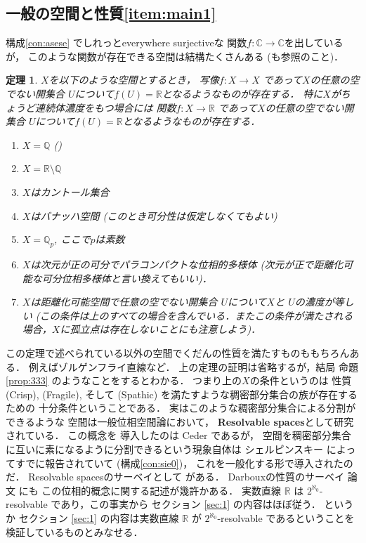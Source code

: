 \documentclass[leqno, a4paper, 12pt]{jsarticle}
\newtheorem{thm}{定理}
\theoremstyle{definition}
\newcommand{\qq}{\mathbb{Q}}
\newcommand{\rr}{\mathbb{R}}
\newcommand{\cc}{\mathbb{C}}
\newcommand{\myco}{2^{\aleph_{0}}}
\newcommand{\mysei}{\textup{(Crisp)}}
\newcommand{\mysq}{\textup{(Fragile)}}
\newcommand{\mysw}{\textup{(Spathic)}}
\begin{document}
\subsection{一般の空間と性質\ref{item:main1}}


構成\ref{con:asese}
でしれっとeverywhere surjectiveな
関数$f\colon\cc\to\cc$を出しているが，
このような関数が存在できる空間は結構たくさんある
(\cite[Sec.5]{MR3293811}も参照のこと)．
\begin{thm}
$X$を以下のような空間とするとき，
写像$f\colon X\to X$
であって$X$の任意の空でない開集合
$U$について$f(U)=\rr$となるようなものが存在する．
特に$X$がちょうど連続体濃度をもつ場合には
関数$f\colon X\to \rr$
であって$X$の任意の空でない開集合
$U$について$f(U)=\rr$となるようなものが存在する．
\begin{enumerate}[label=\textup{(\arabic*)}]
\item
 $X=\qq$
 (\cite[Sec.2]{MR3815388})
 \item 
 $X=\rr\setminus \qq$
 \item 
 $X$はカントール集合
\item 
$X$はバナッハ空間 
(このとき可分性は仮定しなくてもよい)
\item 
$X=\qq_{p}$, 
ここで$p$は素数
\item 
$X$は次元が正の可分でパラコンパクトな位相的多様体
(次元が正で距離化可能な可分位相多様体と言い換えてもいい)．
\item 
$X$は距離化可能空間で任意の空でない開集合
$U$について$X$と
$U$の濃度が等しい
(この条件は上のすべての場合を含んでいる．またこの条件が満たされる場合，$X$に孤立点は存在しないことにも注意しよう)．
\end{enumerate}
\end{thm}
この定理で述べられている以外の空間でくだんの性質を満たすものももちろんある．
例えばゾルゲンフライ直線など．
上の定理の証明は省略するが，結局
命題
\ref{prop:333}
のようなことをするとわかる．
つまり上の$X$の条件というのは
性質
\mysei, 
\mysq, 
そして
\mysw
を満たすような稠密部分集合の族が存在するための
十分条件ということである．
実はこのような稠密部分集合による分割ができるような
空間は一般位相空間論において，
\textbf{Resolvable spaces}として研究されている．
この概念を
導入したのは
Ceder \cite{MR0163279}
であるが，
空間を稠密部分集合に互いに素になるように分割できるという現象自体は
シェルピンスキー
\cite{MR0031222}
によってすでに報告されていて
(構成\ref{con:sie0})，
これを一般化する形で導入されたのだ．
Resolvable spacesのサーベイとして
\cite{MR1425934}
がある．
Darbouxの性質のサーベイ
論文
\cite{MR3293811}
にも
この位相的概念に関する記述が幾許かある．
実数直線
$\rr$
は
$\myco$-resolvable 
であり，この事実から
セクション
\ref{sec:1}
の内容はほぼ従う．
というか
セクション
\ref{sec:1}
の内容は実数直線
$\rr$
が
$\myco$-resolvable 
であるということを検証しているものとみなせる．
\end{document}
